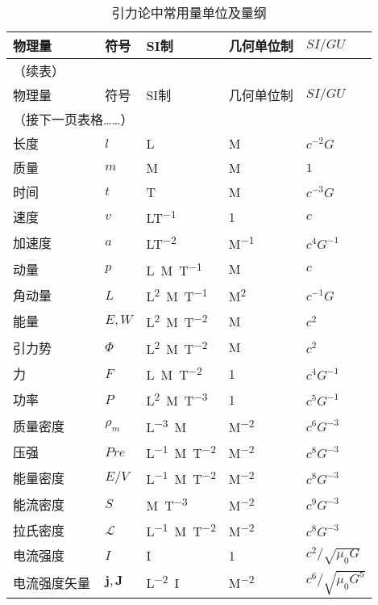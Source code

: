 \begin{longtable}{|*5{l|}}
    \caption{引力论中常用量单位及量纲}    \label{chunit-dim:unitdimenG}  \\    \hline
    物理量 & 符号   &   \si{SI}制   &    几何单位制 &  $SI/GU$  \\ \hline
    \endfirsthead
    \multicolumn{2}{l}{（续表）} \\ \hline
    物理量 & 符号   &   \si{SI}制   &   几何单位制  &  $SI/GU$ \\ \hline
    \endhead \hline
    \multicolumn{2}{c}{（接下一页表格……）} \\[2ex]
    \endfoot
    \endlastfoot
    长度 & $l$ & \si{L} &  \si{M^{}} & $c^{-2}G$ \\
    质量 & $m$ & \si{M} &  \si{M^{}}&  ${1}$ \\
    时间 & $t$ & \si{T} &  \si{M^{}} & $c^{-3}G$ \\
    速度 & $v$ & \si{LT^{-1}}  & \si{1}& $c$ \\
    加速度 & $a$ & \si{LT^{-2}}  & \si{M^{-1}}      & $c^4 G^{-1}$ \\
    动量 & $p$ & \si{L^{}M^{}T^{-1}}    & \si{M^{}} & $c^{}$ \\
    角动量 & $L$ & \si{L^{2}M^{}T^{-1}}   & \si{M^{2}}&  $c^{-1}G$ \\
    能量 & $E,W$ & \si{L^{2}M^{}T^{-2}}   &  \si{M^{}} & $c^2$ \\
    引力势 & $\Phi$ & \si{L^{2}M^{}T^{-2}}   &  \si{M} & $c^{2}$ \\
    力 & $F$ & \si{L^{}M^{}T^{-2}}   &  \si{1} & $c^{4}G^{-1}$ \\
    功率 & $P$ & \si{L^{2}M^{}T^{-3}}     & \si{1}&  $c^{5}G^{-1}$ \\
    质量密度 & $\rho_m$ & \si{L^{-3}M^{}}     & \si{M^{-2}}&  $c^{6}G^{-3}$ \\
    压强 & $Pre$ & \si{L^{-1}M^{}T^{-2}}     & \si{M^{-2}}&  $c^{8}G^{-3}$ \\
    能量密度 & $E/V$     &  \si{L^{-1}M^{}T^{-2}}      &   \si{M^{-2}}&   $c^{8}G^{-3}$ \\
    能流密度 & $S$ & \si{M^{}T^{-3}}    & \si{M^{-2}} & $c^{9}G^{-3}$ \\
    拉氏密度 & $\mathscr{L}$     &  \si{L^{-1}M^{}T^{-2}}      &   \si{M^{-2}}&   $c^{8}G^{-3}$ \\
    电流强度 & $I$     &   \si{I}        & \si{1}  &$c^2 /\sqrt{\mu_0 G}$ \\
    电流强度矢量 & $\boldsymbol{j,J}$     &   \si{L^{-2}I}        &  \si{M^{-2}} & $c^{6} /\sqrt{\mu_0 G^5}$ \\

\end{longtable}
